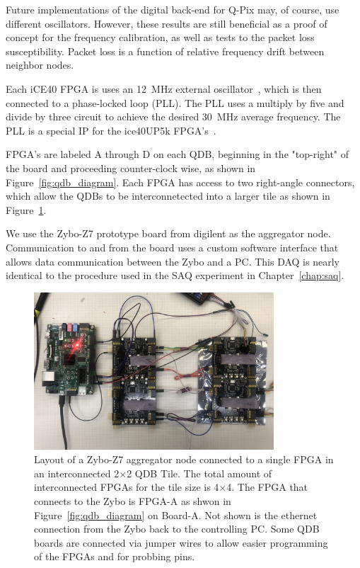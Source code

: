 Future implementations of the digital back-end for Q-Pix may, of course, use different oscillators.
However, these results are still beneficial as a proof of concept for the frequency calibration, as well as tests to the packet loss susceptibility.
Packet loss is a function of relative frequency drift between neighbor nodes.

Each iCE40 FPGA is uses an 12~\unit{MHz} external oscillator~\citep{ecs1612mv}, which is then connected to a phase-locked loop (PLL).
The PLL uses a multiply by five and divide by three circuit to achieve the desired 30~\unit{MHz} average frequency.
The PLL is a special IP for the ice40UP5k FPGA's~\citep{latticeice40up}.

FPGA's are labeled A through D on each QDB, beginning in the "top-right" of the board and proceeding counter-clock wise, as shown in Figure~\ref{fig:qdb_diagram}.
Each FPGA has access to two right-angle connectors, which allow the QDBs to be interconnetected into a larger tile as shown in Figure~\ref{fig:qdb_test_setup}.

We use the Zybo-Z7 prototype board from digilent as the aggregator node.
Communication to and from the board uses a custom software interface that allows data communication between the Zybo and a PC.
This DAQ is nearly identical to the procedure used in the SAQ experiment in Chapter~\ref{chap:saq}.

\begin{figure}[]
\centering
\includegraphics[width=0.8\textwidth]{./images/qdb_frequency_test_setup.jpg}
\caption{Layout of a Zybo-Z7 aggregator node connected to a single FPGA in an interconnected 2$\times$2 QDB Tile.
The total amount of interconnected FPGAs for the tile size is 4$\times$4.
The FPGA that connects to the Zybo is FPGA-A as shwon in Figure~\ref{fig:qdb_diagram} on Board-A.
Not shown is the ethernet connection from the Zybo back to the controlling PC.
Some QDB boards are connected via jumper wires to allow easier programming of the FPGAs and for probbing pins.
}
\label{fig:qdb_test_setup}
\end{figure}

